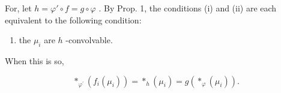 For, let \(h = \varphi' \circ f = g \circ \varphi\) . By Prop. 1, the conditions (i) and (ii) are each equivalent to the following condition:

\begin{enumerate}
\def\labelenumi{(\roman{enumi})}
\setcounter{enumi}{2}
\tightlist
\item
  the \(\mu_{i}\) are \(h\) -convolvable.
\end{enumerate}

When this is so,

\[
\left. \ast_ {\varphi^ {\prime}} \left(f _ {i} \left(\mu_ {i}\right)\right) = \ast_ {h} \left(\mu_ {i}\right) = g \left(\ast_ {\varphi} \left(\mu_ {i}\right)\right). \right.
\]

